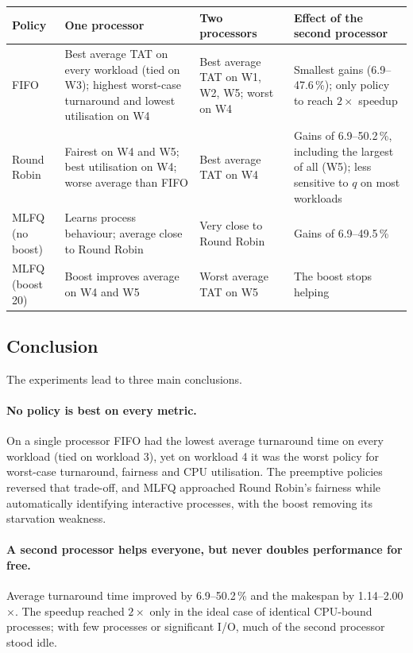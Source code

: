 \documentclass[11pt,a4paper]{article}
\begin{document}
\begin{center}\small
\begin{tabular}{l>{\raggedright\arraybackslash}p{4.2cm}>{\raggedright\arraybackslash}p{4.2cm}>{\raggedright\arraybackslash}p{3.6cm}}
\toprule
\textbf{Policy} & \textbf{One processor} & \textbf{Two processors} & \textbf{Effect of the second processor}\\
\midrule
FIFO & Best average TAT on every workload (tied on W3); highest worst-case turnaround and lowest utilisation on W4 & Best average TAT on W1, W2, W5; worst on W4 & Smallest gains (6.9--47.6\,\%); only policy to reach $2\times$ speedup \\ \addlinespace
Round Robin & Fairest on W4 and W5; best utilisation on W4; worse average than FIFO & Best average TAT on W4 & Gains of 6.9--50.2\,\%, including the largest of all (W5); less sensitive to $q$ on most workloads \\ \addlinespace
MLFQ (no boost) & Learns process behaviour; average close to Round Robin & Very close to Round Robin & Gains of 6.9--49.5\,\% \\ \addlinespace
MLFQ (boost 20) & Boost improves average on W4 and W5 & Worst average TAT on W5 & The boost stops helping \\
\bottomrule
\end{tabular}
\end{center}

\subsection*{Conclusion}

The experiments lead to three main conclusions.

\paragraph{No policy is best on every metric.} On a single processor FIFO had the lowest
average turnaround time on every workload (tied on workload 3), yet on workload 4 it was the
worst policy for worst-case turnaround, fairness and CPU utilisation. The preemptive policies
reversed that trade-off, and MLFQ approached Round Robin's fairness while automatically
identifying interactive processes, with the boost removing its starvation weakness.

\paragraph{A second processor helps everyone, but never doubles performance for free.}
Average turnaround time improved by 6.9--50.2\,\% and the makespan by
1.14--2.00$\times$. The speedup reached $2\times$ only in the ideal case of identical
CPU-bound processes; with few processes or significant I/O, much of the second processor
stood idle.
\end{document}
